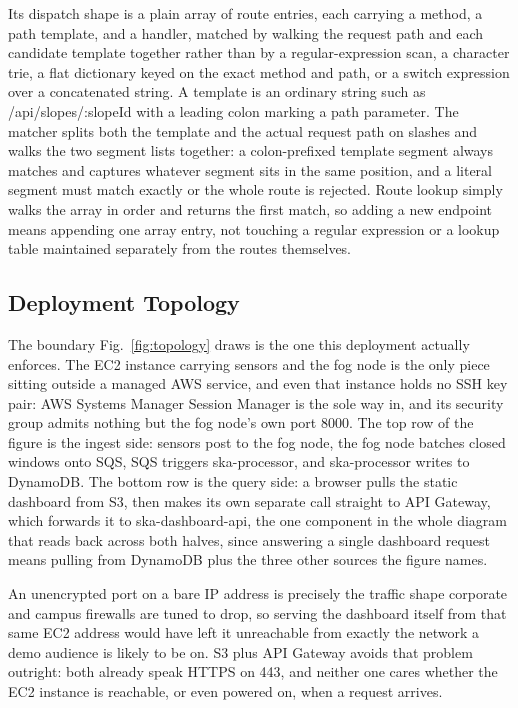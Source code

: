 \documentclass[conference]{IEEEtran}
\begin{document}
Its dispatch shape is a plain array of route entries, each carrying a method, a path template, and a handler, matched by walking the request path and each candidate template together rather than by a regular-expression scan, a character trie, a flat dictionary keyed on the exact method and path, or a switch expression over a concatenated string. A template is an ordinary string such as /api/slopes/:slopeId with a leading colon marking a path parameter. The matcher splits both the template and the actual request path on slashes and walks the two segment lists together: a colon-prefixed template segment always matches and captures whatever segment sits in the same position, and a literal segment must match exactly or the whole route is rejected. Route lookup simply walks the array in order and returns the first match, so adding a new endpoint means appending one array entry, not touching a regular expression or a lookup table maintained separately from the routes themselves.

\subsection{Deployment Topology}
The boundary Fig.~\ref{fig:topology} draws is the one this deployment actually enforces. The EC2 instance carrying sensors and the fog node is the only piece sitting outside a managed AWS service, and even that instance holds no SSH key pair: AWS Systems Manager Session Manager is the sole way in, and its security group admits nothing but the fog node's own port 8000. The top row of the figure is the ingest side: sensors post to the fog node, the fog node batches closed windows onto SQS, SQS triggers ska-processor, and ska-processor writes to DynamoDB. The bottom row is the query side: a browser pulls the static dashboard from S3, then makes its own separate call straight to API Gateway, which forwards it to ska-dashboard-api, the one component in the whole diagram that reads back across both halves, since answering a single dashboard request means pulling from DynamoDB plus the three other sources the figure names.

An unencrypted port on a bare IP address is precisely the traffic shape corporate and campus firewalls are tuned to drop, so serving the dashboard itself from that same EC2 address would have left it unreachable from exactly the network a demo audience is likely to be on. S3 plus API Gateway avoids that problem outright: both already speak HTTPS on 443, and neither one cares whether the EC2 instance is reachable, or even powered on, when a request arrives.
\end{document}

